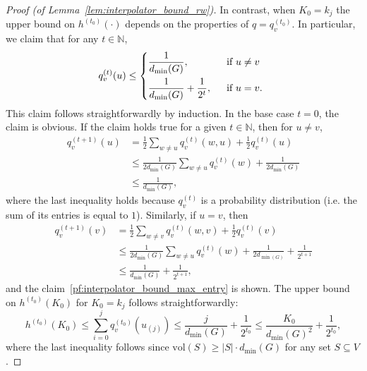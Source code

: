 \documentclass{article}
\newcommand{\vol}{\mathrm{vol}}
\newcommand{\1}{\mathbf{1}}
\theoremstyle{definition}
\theoremstyle{remark}
\begin{document}
\begin{proof}[Proof (of Lemma~\ref{lem:interpolator_bound_rw})]
	In contrast, when $K_0 = k_j$ the upper bound on $h^{(t_0)}(\cdot)$ depends on the properties of $q = q_v^{(t_0)}$. In particular, we claim that for any $t \in \mathbb{N}$,
	\begin{equation}
	\label{pf:interpolator_bound_max_entry}
	q_v^{(t)}(u) \leq
	\begin{dcases*}
	\frac{1}{d_{\min}(G)},& ~~\textrm{if $u \neq v$} \\
	\frac{1}{d_{\min}(G)} + \frac{1}{2^t},& ~~\textrm{if $u = v$.}
	\end{dcases*}
	\end{equation}
	This claim follows straightforwardly by induction. In the base case $t = 0$, the claim is obvious. If the claim holds true for a given $t \in \mathbb{N}$, then for $u \neq v$,
	\begin{equation}
	\label{pf:interpolator_bound_max_entry_inductive_step}
	\begin{aligned}
	q_v^{(t + 1)}(u) & = \frac{1}{2}\sum_{w \neq u}q_v^{(t)}(w,u)  + \frac{1}{2}q_v^{(t)}(u) \\
	& \leq \frac{1}{2d_{\min}(G)}\sum_{w \neq u}q_v^{(t)}(w)  + \frac{1}{2d_{\min}(G)} \\
	& \leq \frac{1}{d_{\min}(G)},
	\end{aligned}
	\end{equation}
	where the last inequality holds because $q_v^{(t)}$ is a probability distribution (i.e. the sum of its entries is equal to $1$). Similarly, if $u = v$, then
	\begin{align*}
	q_v^{(t + 1)}(v) & = \frac{1}{2}\sum_{w \neq v}q_v^{(t)}(w,v)  + \frac{1}{2}q_v^{(t)}(v) \\
	& \leq \frac{1}{2d_{\min}(G)}\sum_{w \neq u}q_v^{(t)}(w)  + \frac{1}{2d_{\min(G)}} + \frac{1}{2^{t + 1}} \\
	& \leq \frac{1}{d_{\min}(G)} + \frac{1}{2^{t + 1}},
	\end{align*}
	and the claim~\eqref{pf:interpolator_bound_max_entry} is shown. The upper bound on $h^{(t_0)}(K_0)$ for $K_0 = k_j$ follows straightforwardly:
	\begin{equation*}
	h^{(t_0)}(K_0) \leq \sum_{i = 0}^{j} q_v^{(t_0)}(u_{(j)}) \leq \frac{j}{d_{\min}(G)} + \frac{1}{2^{t_0}} \leq \frac{K_0}{d_{\min}(G)^2} + \frac{1}{2^{t_0}},
	\end{equation*}
	where the last inequality follows since $\vol(S) \geq |S| \cdot d_{\min}(G)$ for any set $S \subseteq V$. 
\end{proof}
\end{document}
